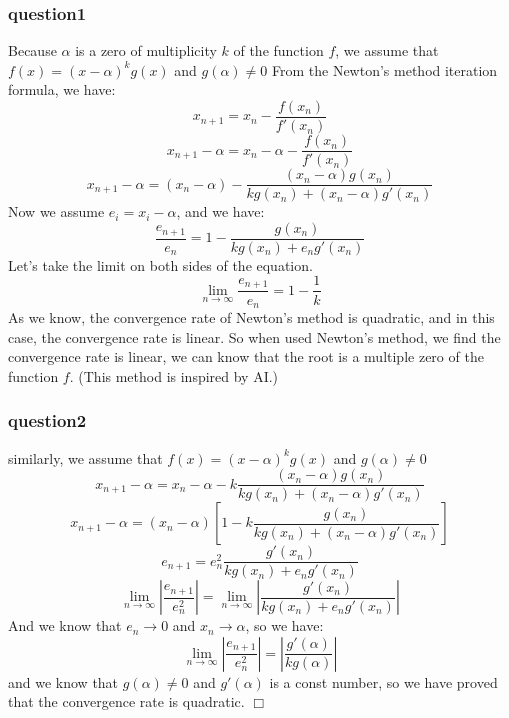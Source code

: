 \documentclass[a4paper]{article}
\begin{document}
\subsubsection*{question1}
Because $\alpha $ is a zero of multiplicity $k$ of the function $f$, we assume that $f(x)= (x - \alpha )^{k}g(x)$ and $g(\alpha )\neq 0 $
From the Newton's method iteration formula, we have:
$$x_{n+1}= x_{n}- \frac{f(x_n)}{f'(x_{n})}$$
$$x_{n+1}-\alpha = x_{n}-\alpha - \frac{f(x_n)}{f'(x_{n})}$$
$$x_{n+1}-\alpha = (x_{n}-\alpha)-\frac{(x_{n}-\alpha)g(x_n)}{kg(x_n)+(x_n-\alpha)g'(x_n)}$$
Now we assume $e_{i}=x_{i}-\alpha$, and we have:
$$\frac{e_{n+1} }{e_{n}}=1-\frac{g(x_n)}{kg(x_n)+e_{n}g'(x_n)}$$
Let's take the limit on both sides of the equation.
$$\lim_{n \to \infty}\frac{e_{n+1} }{e_{n}}=1 -\frac{1}{k}$$
As we know, the convergence rate of Newton's method is quadratic, and in this case, the convergence rate is linear.
So when used Newton's method, we find the convergence rate is linear, we can know that the root is a multiple zero of the function $f$.
(This method is inspired by AI.)\cite{openai2024chatgpt}

\subsubsection*{question2}
similarly, we assume that $f(x)= (x - \alpha  )^{k}g(x)$ and $g(\alpha )\neq 0 $  
$$x_{n+1} - \alpha  = x_n -\alpha - k \frac{(x_{n}-\alpha)g(x_n)}{kg(x_n)+(x_n-\alpha)g'(x_n)}$$
$$x_{n+1} - \alpha = (x_n -\alpha)[1 - k \frac{g(x_n)}{kg(x_n)+(x_n-\alpha)g'(x_n)}]$$
$$e_{n+1}=e_{n}^{2}\frac{g'(x_n)}{kg(x_n)+e_{n}g'(x_n)}$$
$$\lim_{n \to \infty}|\frac{e_{n+1} }{e_{n}^{2}}|=\lim_{n \to \infty}|\frac{g'(x_n)}{kg(x_n)+e_{n}g'(x_n)}|$$
And we know that $e_n \rightarrow 0$ and $x_{n}\rightarrow \alpha $, so we have:
$$\lim_{n \to \infty}|\frac{e_{n+1} }{e_{n}^{2}}|=|\frac{g'(\alpha )}{kg(\alpha )}|$$
and we know that $g(\alpha )\neq 0$ and $g'(\alpha )$ is a const number, so we have proved that the convergence rate is quadratic. $\Box $


\section*{  }
\printbibliography
\end{document}
